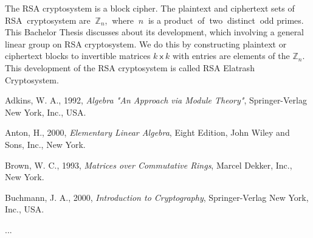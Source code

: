 \documentclass[skripsi]{unhasskripsi}
\theoremstyle{definition}
\begin{document}
    \begin{abstracteng}
        The RSA cryptosystem is a block cipher. The plaintext and ciphertext sets of RSA $\ $cryptosystem are $\ \mathbb{Z}_{n}$, $\ $where $\ n\ $ is a product $\ $of $\ $two $\ $distinct $\ $odd primes.$\ $ This Bachelor Thesis discusses about its development, which involving a general linear group on RSA cryptosystem. We do this by constructing plaintext or ciphertext blocks to invertible matrices \mbox{$k \ \mathsf{x} \ k$} with entries are elements of the $\mathbb{Z}_{n}$. This development of the RSA cryptosystem is called RSA Elatrash Cryptosystem.
    \end{abstracteng}

    

    \begin{thebibliography}{99}
        Adkins, W. A., 1992, \emph{Algebra "An Approach via Module Theory"},  Springer-Verlag New York, Inc., USA.

        Anton, H., 2000, \emph{Elementary Linear Algebra}, Eight Edition,  John Wiley and Sons, Inc., New York.

        Brown, W. C., 1993, \emph{Matrices over Commutative Rings}, Marcel Dekker, Inc., New York.

        Buchmann, J. A., 2000, \emph{Introduction to Cryptography}, Springer-Verlag New York, Inc., USA.

        ...
    \end{thebibliography}
\end{document}
